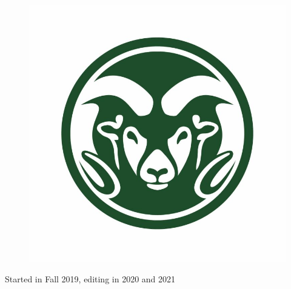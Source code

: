 \begin{titlepage}
	\begin{figure}[H]
	    \centering
	    \includegraphics[width=.8\textwidth]{Frontmatter/ram_logo.jpg}
	\end{figure}

	\vspace{0.3\baselineskip} %

	Started in Fall 2019, editing in 2020 and 2021 %


\end{titlepage}